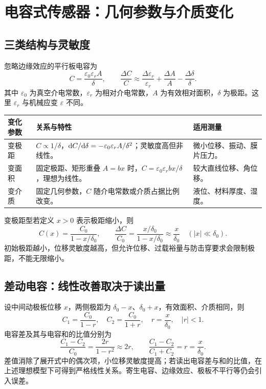 
\Needspace{5cm}
\section{电容式传感器：几何参数与介质变化}
\label{sec:ch4-capacitance}
\subsection{三类结构与灵敏度}
忽略边缘效应的平行板电容为
\[
\boxed{C=\frac{\varepsilon_0\varepsilon_rA}{\delta}},\qquad
\frac{\Delta C}{C}\approx\frac{\Delta\varepsilon_r}{\varepsilon_r}
+\frac{\Delta A}{A}-\frac{\Delta\delta}{\delta}.
\]
其中 $\varepsilon_0$ 为真空介电常数，$\varepsilon_r$ 为相对介电常数，$A$ 为有效相对面积，$\delta$ 为极距。这里 $\varepsilon_r$ 与机械应变 $\varepsilon$ 不同。

\begin{table}[H]
\centering\small
\begin{tabularx}{\linewidth}{@{}p{2.1cm} p{4.9cm} X@{}}
\toprule
变化参数 & 关系与特性 & 适用测量 \\
\midrule
变极距 & $C\propto1/\delta$，$\mathrm{d} C/\mathrm{d}\delta=-\varepsilon_0\varepsilon_rA/\delta^2$；灵敏度高但非线性。 & 微小位移、振动、膜片压力。 \\
变面积 & 固定极距、矩形重叠 $A=bx$ 时，$C=\varepsilon_0\varepsilon_rb x/\delta$，理想为线性。 & 较大直线位移、角位移。 \\
变介质 & 固定几何参数，$C$ 随介电常数或介质占据比例改变。 & 液位、材料厚度、湿度。 \\
\bottomrule
\end{tabularx}
\end{table}

变极距型若定义 $x>0$ 表示极距缩小，则
\[
C(x)=\frac{C_0}{1-x/\delta_0},\qquad
\frac{\Delta C}{C_0}=\frac{x/\delta_0}{1-x/\delta_0}
\approx\frac{x}{\delta_0}\quad(|x|\ll\delta_0).
\]
初始极距越小，位移灵敏度越高，但允许位移、过载裕量与防击穿要求会限制极距，不能无限缩小。

\subsection{差动电容：线性改善取决于读出量}
设中间动极板位移 $x$，两侧极距为 $\delta_0-x$、$\delta_0+x$，有效面积、介质相同，则
\[
C_1=\frac{C_0}{1-r},\quad C_2=\frac{C_0}{1+r},\quad r=\frac{x}{\delta_0},\quad |r|<1.
\]
电容差及其与电容和的比值分别为
\[
\frac{C_1-C_2}{C_0}=\frac{2r}{1-r^2}\approx2r,\qquad
\boxed{\frac{C_1-C_2}{C_1+C_2}=r=\frac{x}{\delta_0}}.
\]
差值消除了展开式中的偶次项，小位移灵敏度提高；若读出电容差与和的比值，在上述理想模型下可得到严格线性关系。寄生电容、边缘效应、极板不平行等仍会引入误差。

